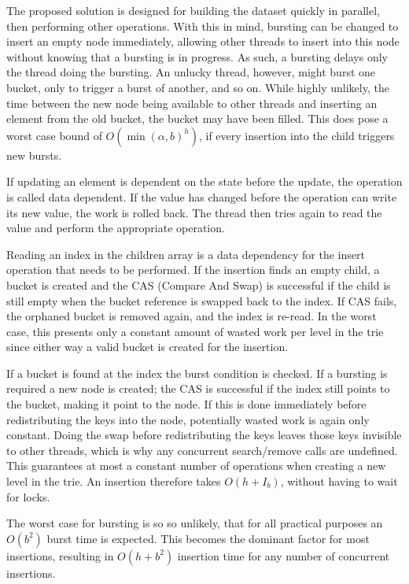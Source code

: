 The proposed solution is designed for building the dataset quickly in
parallel, then performing other operations. With this in mind, bursting can be
changed to insert an empty node immediately, allowing other threads to insert
into this node without knowing that a bursting is in progress. As such, a
bursting delays only the thread doing the bursting. An unlucky thread, however,
might burst one bucket, only to trigger a burst of another, and so on. While
highly unlikely, the time between the new node being available to other threads
and inserting an element from the old bucket, the bucket may have been filled.
This does pose a worst case bound of $O(\min(\alpha, b)^h)$, if every insertion
into the child triggers new bursts. 

If updating an element is dependent on the state before the update, the operation
is called data dependent. If the value has changed before the operation can write
its new value, the work is rolled back. The thread then tries again to read the
value and perform the appropriate operation.

Reading an index in the children array is a data dependency for the insert
operation that needs to be performed. If the insertion finds an empty child,
a bucket is created and the CAS (Compare And Swap) is successful if
the child is still empty when the bucket reference is swapped back to the
index. If CAS fails, the orphaned bucket is removed again, and the index is
re-read. In the worst case, this presents only a constant amount of wasted work
per level in the trie since either way a valid bucket is created for the
insertion.

If a bucket is found at the index the burst condition is checked. If a bursting
is required a new node is created; the CAS is successful if the index
still points to the bucket, making it point to the node. If this is done
immediately before redistributing the keys into the node, potentially wasted
work is again only constant. Doing the swap before redistributing the
keys leaves those keys invisible to other threads, which is why any concurrent
search/remove calls are undefined. This guarantees at most a constant
number of operations when creating a new level in the trie. An insertion
therefore takes $O(h+I_b)$, without having to wait for locks.

The worst case for bursting is so so unlikely, that for all practical purposes
an $O(b^2)$ burst time is expected. This becomes the dominant factor for most
insertions, resulting in $O(h+b^2)$ insertion time for any number of concurrent
insertions.

